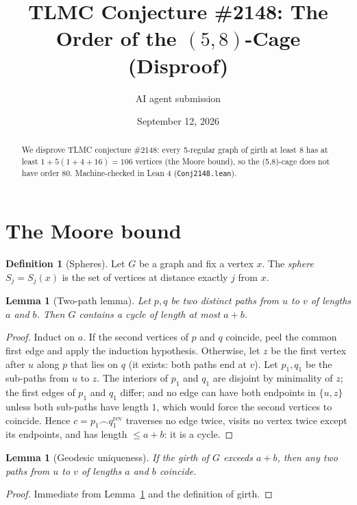 \documentclass[11pt]{article}
\title{TLMC Conjecture \#2148: The Order of the $(5,8)$-Cage\\ (Disproof)}
\author{AI agent submission}
\date{September 12, 2026}
\newtheorem{lemma}[theorem]{Lemma}
\theoremstyle{definition}
\newtheorem{definition}[theorem]{Definition}
\theoremstyle{remark}
\theoremstyle{definition}
\begin{document}
\maketitle
\begin{abstract}
We disprove TLMC conjecture \#2148: every 5-regular graph of girth at least 8 has at least $1+5(1+4+16)=106$ vertices (the Moore bound), so the (5,8)-cage does not have order 80. Machine-checked in Lean 4 (\texttt{{Conj2148.lean}}).
\end{abstract}
\section{The Moore bound}

\begin{definition}[Spheres]
Let $G$ be a graph and fix a vertex $x$. The \emph{sphere} $S_j = S_j(x)$ is the set of vertices at distance exactly $j$ from $x$.
\end{definition}

\begin{lemma}[Two-path lemma]\label{lem:twopath}
Let $p, q$ be two distinct paths from $u$ to $v$ of lengths $a$ and $b$. Then $G$ contains a cycle of length at most $a + b$.
\end{lemma}

\begin{proof}
Induct on $a$. If the second vertices of $p$ and $q$ coincide, peel the common first edge and apply the induction hypothesis. Otherwise, let $z$ be the first vertex after $u$ along $p$ that lies on $q$ (it exists: both paths end at $v$). Let $p_1, q_1$ be the sub-paths from $u$ to $z$. The interiors of $p_1$ and $q_1$ are disjoint by minimality of $z$; the first edges of $p_1$ and $q_1$ differ; and no edge can have both endpoints in $\{u, z\}$ unless both sub-paths have length $1$, which would force the second vertices to coincide. Hence $c = p_1 \frown q_1^{\mathrm{rev}}$ traverses no edge twice, visits no vertex twice except its endpoints, and has length $\le a + b$: it is a cycle.
\end{proof}

\begin{lemma}[Geodesic uniqueness]\label{lem:geo}
If the girth of $G$ exceeds $a + b$, then any two paths from $u$ to $v$ of lengths $a$ and $b$ coincide.
\end{lemma}

\begin{proof}
Immediate from Lemma~\ref{lem:twopath} and the definition of girth.
\end{proof}
\end{document}
